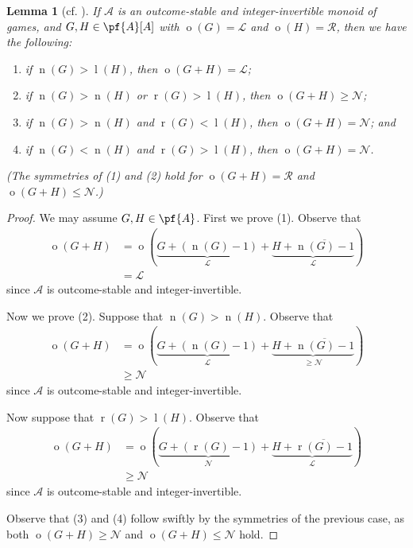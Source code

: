 \documentclass[11pt]{article}
\newtheorem{lemma}[theorem]{Lemma}
\theoremstyle{definition}
\DeclareMathOperator{\outcome}{o}
\newcommand{\set}[1]{\mathcal{#1}}
\DeclareMathOperator{\ltp}{l}
\DeclareMathOperator{\ntp}{n}
\DeclareMathOperator{\rtp}{r}
\begin{document}
\begin{lemma}[cf. {\cite[Lemma 14 on p.~8]{milley.renault:invertible}}]
    \label{lem:14}
    If $\set{A}$ is an outcome-stable and integer-invertible monoid of games,
    and $G,H\in\pf{A}[A]$ with $\outcome(G)=\mathscr{L}$ and
    $\outcome(H)=\mathscr{R}$, then we have the following:
    \begin{enumerate}
        \item
            if $\ntp(G)>\ltp(H)$, then $\outcome(G+H)=\mathscr{L}$;
        \item
            if $\ntp(G)>\ntp(H)$ or $\rtp(G)>\ltp(H)$, then
            $\outcome(G+H)\geq\mathscr{N}$;
        \item
            if $\ntp(G)>\ntp(H)$ and $\rtp(G)<\ltp(H)$, then
            $\outcome(G+H)=\mathscr{N}$;
            and
        \item
            if $\ntp(G)<\ntp(H)$ and $\rtp(G)>\ltp(H)$, then
            $\outcome(G+H)=\mathscr{N}$.
    \end{enumerate}
    (The symmetries of (1) and (2) hold for $\outcome(G+H)=\mathscr{R}$ and
    $\outcome(G+H)\leq\mathscr{N}$.)
\end{lemma}

\begin{proof}
    We may assume $G,H\in\pf{A}$. First we prove (1). Observe that
    \begin{align*}
        \outcome(G+H)&=
        \outcome(\underbrace{G+(\ntp(G)-1)}_{\mathscr{L}}+
        \underbrace{H+\overline{\ntp(G)-1}}_{\mathscr{L}})\\
                     &=\mathscr{L}
    \end{align*}
    since $\set{A}$ is outcome-stable and integer-invertible.

    Now we prove (2). Suppose that $\ntp(G)>\ntp(H)$. Observe that
    \begin{align*}
        \outcome(G+H)&=
        \outcome(\underbrace{G+(\ntp(G)-1)}_{\mathscr{L}}+
        \underbrace{H+\overline{\ntp(G)-1}}_{\geq\mathscr{N}})\\
                     &\geq\mathscr{N}
    \end{align*}
    since $\set{A}$ is outcome-stable and integer-invertible.

    Now suppose that $\rtp(G)>\ltp(H)$. Observe that
    \begin{align*}
        \outcome(G+H)&=
        \outcome(\underbrace{G+(\rtp(G)-1)}_{\mathscr{N}}+
        \underbrace{H+\overline{\rtp(G)-1}}_{\mathscr{L}})\\
                     &\geq\mathscr{N}
    \end{align*}
    since $\set{A}$ is outcome-stable and integer-invertible.

    Observe that (3) and (4) follow swiftly by the symmetries of the previous
    case, as both $\outcome(G+H)\geq\mathscr{N}$ and
    $\outcome(G+H)\leq\mathscr{N}$ hold.
\end{proof}
\end{document}
